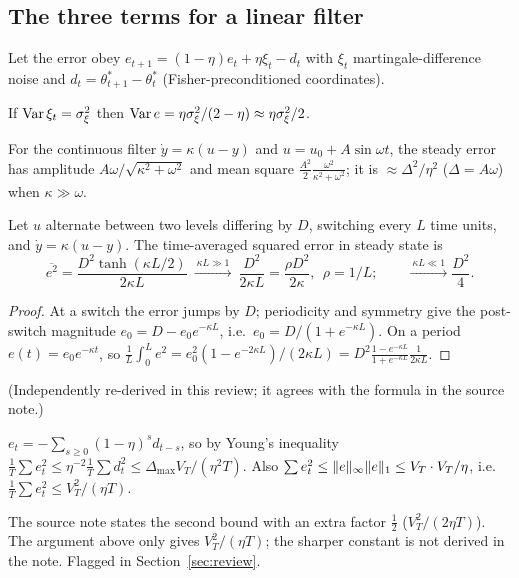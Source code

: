 \subsection{The three terms for a linear filter}

Let the error obey $e_{t+1}=(1-\eta)e_t+\eta\xi_t-d_t$ with $\xi_t$ martingale-difference noise and $d_t=\theta^*_{t+1}-\theta^*_t$ (Fisher-preconditioned coordinates).

\begin{proposition}[noise]\label{prop:noise}\Pt{}
If $\operatorname{Var}\xi_t=\sigma_\xi^2$ then $\operatorname{Var} e=\eta\sigma_\xi^2/(2-\eta)\approx\eta\sigma_\xi^2/2$.
\end{proposition}

\begin{proposition}\label{prop:sin}\Pt{}
For the continuous filter $\dot y=\kappa(u-y)$ and $u=u_0+A\sin\omega t$, the steady error has amplitude $A\omega/\sqrt{\kappa^2+\omega^2}$ and mean square $\frac{A^2}2\frac{\omega^2}{\kappa^2+\omega^2}$; it is $\approx\Delta^2/\eta^2$ ($\Delta=A\omega$) when $\kappa\gg\omega$.
\end{proposition}

\begin{proposition}\label{prop:tanh}\Pt{}
Let $u$ alternate between two levels differing by $D$, switching every $L$ time units, and $\dot y=\kappa(u-y)$. The time-averaged squared error in steady state is
\[
\overline{e^2}=\frac{D^2\tanh(\kappa L/2)}{2\kappa L}\ \xrightarrow{\ \kappa L\gg1\ }\ \frac{D^2}{2\kappa L}=\frac{\rho D^2}{2\kappa},\ \ \rho=1/L;\qquad\xrightarrow{\ \kappa L\ll1\ }\frac{D^2}4 .
\]
\end{proposition}
\begin{proof}
At a switch the error jumps by $D$; periodicity and symmetry give the post-switch magnitude $e_0=D-e_0e^{-\kappa L}$, i.e.\ $e_0=D/(1+e^{-\kappa L})$. On a period $e(t)=e_0e^{-\kappa t}$, so $\frac1L\int_0^Le^2=e_0^2(1-e^{-2\kappa L})/(2\kappa L)=D^2\frac{1-e^{-\kappa L}}{1+e^{-\kappa L}}\frac1{2\kappa L}$.
\end{proof}
(Independently re-derived in this review; it agrees with the formula in the source note.)

\begin{proposition}\label{prop:pathlen}\Pt{}
$e_t=-\sum_{s\ge0}(1-\eta)^sd_{t-s}$, so by Young's inequality $\frac1T\sum e_t^2\le\eta^{-2}\frac1T\sum d_t^2\le\Delta_{\max}V_T/(\eta^2T)$. Also $\sum e_t^2\le\lVert e\rVert_\infty\lVert e\rVert_1\le V_T\cdot V_T/\eta$, i.e.\ $\frac1T\sum e_t^2\le V_T^2/(\eta T)$.
\end{proposition}
\begin{remark}
The source note states the second bound with an extra factor $\frac12$ ($V_T^2/(2\eta T)$). The argument above only gives $V_T^2/(\eta T)$; the sharper constant is not derived in the note. Flagged in Section~\ref{sec:review}.
\end{remark}

